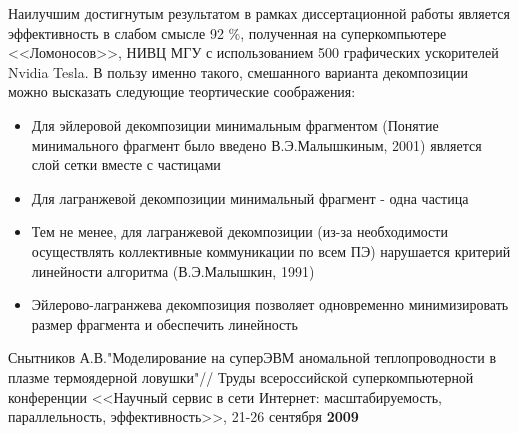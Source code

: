 Наилучшим достигнутым результатом в рамках диссертационной работы является эффективность в слабом смысле 92 \%, полученная на суперкомпьютере <<Ломоносов>>, НИВЦ МГУ с использованием 500 графических ускорителей Nvidia Tesla. 
В пользу именно такого, смешанного варианта декомпозиции можно высказать следующие теортические соображения:
\begin{itemize}
	\item Для эйлеровой декомпозиции минимальным фрагментом (Понятие минимального фрагмент было введено В.Э.Малышкиным, 2001) является слой сетки вместе с частицами
	\item Для лагранжевой декомпозиции минимальный фрагмент - одна частица
	\item Тем не менее, для лагранжевой декомпозиции (из-за необходимости осуществлять коллективные коммуникации по всем ПЭ) нарушается критерий линейности алгоритма (В.Э.Малышкин, 1991)
	\item Эйлерово-лагранжева декомпозиция позволяет одновременно минимизировать размер фрагмента и обеспечить линейность
	
\end{itemize}

{\small Снытников А.В."Моделирование на суперЭВМ аномальной  теплопроводности в плазме термоядерной ловушки"// Труды всероссийской суперкомпьютерной конференции <<Научный сервис в сети Интернет: масштабируемость, параллельность, эффективность>>, 21-26 сентября \textbf{2009}}


